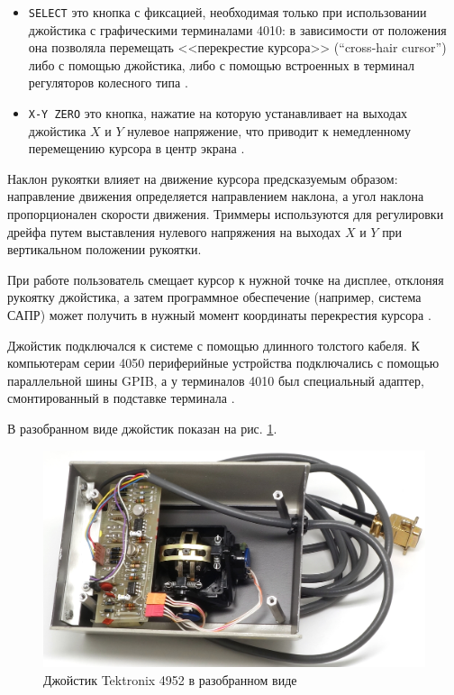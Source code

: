 \documentclass[11pt, a4paper]{article}
\begin{document}
\begin{itemize}
\item \verb!SELECT! это кнопка с фиксацией, необходимая только при использовании джойстика с графическими терминалами 4010: в зависимости от положения она позволяла перемещать <<перекрестие курсора>> (``cross-hair cursor'') либо с помощью джойстика, либо с помощью встроенных в терминал регуляторов колесного типа \cite{manual, manual2}. 

\item \verb!X-Y ZERO! это кнопка, нажатие на которую устанавливает на выходах джойстика $X$ и $Y$ нулевое напряжение, что приводит к немедленному перемещению курсора в центр экрана \cite{manual}.
\end{itemize}

Наклон рукоятки влияет на движение курсора предсказуемым образом: направление движения определяется направлением наклона, а угол наклона пропорционален скорости движения. Триммеры используются для регулировки дрейфа путем выставления нулевого напряжения на выходах $X$ и $Y$ при вертикальном положении рукоятки.

При работе пользователь смещает курсор к нужной точке на дисплее, отклоняя рукоятку джойстика, а затем программное обеспечение (например, система САПР) может получить в нужный момент координаты перекрестия курсора \cite{price}.

Джойстик подключался к системе с помощью длинного толстого кабеля. К компьютерам серии 4050 периферийные устройства подключались с помощью параллельной шины GPIB, а у терминалов 4010 был специальный адаптер, смонтированный в подставке терминала \cite{manual, manual2}.


В разобранном виде джойстик показан на рис. \ref{fig:TektronixJoystickInside}. 

\begin{figure}[h]
    \centering
    \includegraphics[scale=0.8]{1975_Tektronix_4952_Joystick/inside_30.jpg}
    \caption{Джойстик Tektronix 4952 в разобранном виде}
    \label{fig:TektronixJoystickInside}
\end{figure}
\end{document}

